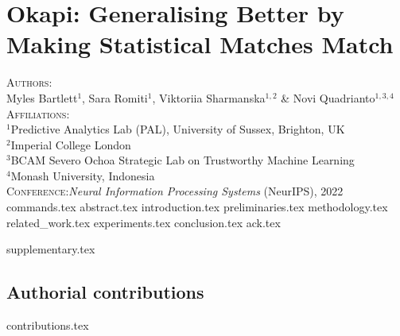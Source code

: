 \chapter{Okapi: Generalising Better by Making Statistical Matches Match}\label{ch:okapi}
\textsc{Authors}:\\
%
Myles Bartlett$^1$,
%
Sara Romiti$^1$,
%
Viktoriia Sharmanska$^{1,2}$
%
\& Novi Quadrianto$^{1,3,4}$ \\
%
\textsc{Affiliations}:\\
%
$^1$Predictive Analytics Lab (PAL), University of Sussex, Brighton, UK\\
%
$^2$Imperial College London \\
%
$^3$BCAM Severo Ochoa Strategic Lab on Trustworthy Machine Learning \\
%
$^4$Monash University, Indonesia \\
%
\textsc{Conference}:\;\;\textit{Neural Information Processing Systems} (NeurIPS), 2022 \\
%
{commands.tex}
{abstract.tex}
{introduction.tex}
{preliminaries.tex}
{methodology.tex}
{related_work.tex}
{experiments.tex}
{conclusion.tex}
{ack.tex}

\newpage
{supplementary.tex}
%
\clearpage
\section{Authorial contributions}
{contributions.tex}
